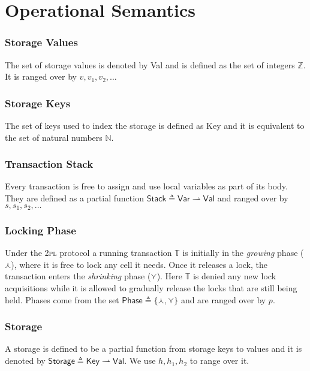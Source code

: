 \section{Operational Semantics}

\subsubsection{Storage Values}

The set of storage values is denoted by \textsf{Val} and is defined as the set of integers $\mathds{Z}$. It is ranged over by $v, v_1, v_2, \ldots$

\subsubsection{Storage Keys}

The set of keys used to index the storage is defined as \textsf{Key} and it is equivalent to the set of natural numbers $\mathds{N}$.

\subsubsection{Transaction Stack}

Every transaction is free to assign and use local variables as part of its body. They are defined as a partial function $\mathsf{Stack} \triangleq \mathsf{Var} \rightharpoonup \mathsf{Val}$ and ranged over by $s, s_1, s_2, \ldots$

\subsubsection{Locking Phase}

Under the \textsc{2pl} protocol a running transaction $\mathds{T}$ is initially in the \textit{growing} phase ($\curlywedge$), where it is free to lock any cell it needs. Once it releases a lock, the transaction enters the \textit{shrinking} phase ($\curlyvee$). Here $\mathds{T}$ is denied any new lock acquisitions while it is allowed to gradually release the locks that are still being held. Phases come from the set $\mathsf{Phase} \triangleq \{ \curlywedge, \curlyvee \}$ and are ranged over by $p$.

\subsubsection{Storage}

A storage is defined to be a partial function from storage keys to values and it is denoted by $\mathsf{Storage} \triangleq \mathsf{Key} \rightharpoonup \mathsf{Val}$. We use $h, h_1, h_2$ to range over it.

